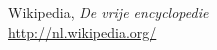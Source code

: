 \begin{thebibliography}{99}

Wikipedia, \textsl{De vrije encyclopedie}
\\\mbox{}\hfill\url{http://nl.wikipedia.org/}

\end{thebibliography}
